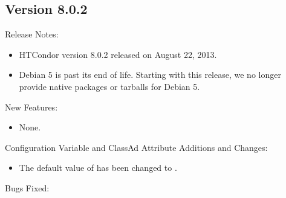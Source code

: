 \subsection*{\label{sec:New-8-0-2}Version 8.0.2}

\noindent Release Notes:

\begin{itemize}

\item HTCondor version 8.0.2 released on August 22, 2013.

\item Debian 5 is past its end of life. 
Starting with this release, we no longer provide native packages or
tarballs for Debian 5.

\end{itemize}


\noindent New Features:

\begin{itemize}

\item None.

\end{itemize}

\noindent Configuration Variable and ClassAd Attribute Additions and Changes:

\begin{itemize}

\item The default value of  
has been changed to .

\end{itemize}

\noindent Bugs Fixed:

